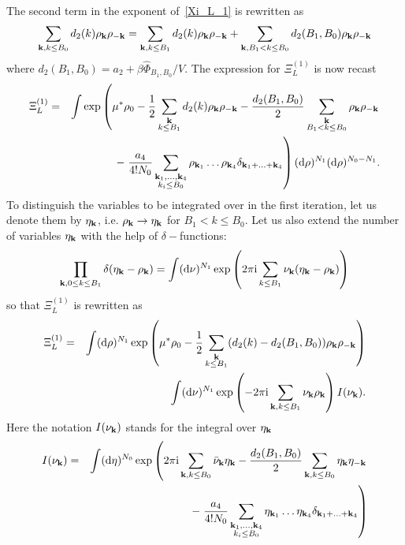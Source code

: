 The second term in the exponent of~\eqref{Xi_L_1} is rewritten as
\begin{equation*}
	\sum_{\substack{\vb k, k \leq B_0}} d_2(k) \rho_{\vb k} \rho_{-\vb k} 
	= 
	\sum_{\substack{\vb k, k \leq B_1}} d_2(k) \rho_{\vb k} \rho_{-\vb k}
	+
	\sum_{\substack{\vb k, B_1 < k \leq B_0}} d_2(B_1, B_0) \rho_{\vb k} \rho_{-\vb k}
\end{equation*}
where $d_2(B_1, B_0) = a_2 + \beta\hat{\Phi}_{B_1, B_0}/V$.
The expression for $\Xi_L^{(1)}$ is now recast
\begin{eqnarray*}
	\Xi_L^{(1)} &=& 
	\int \exp\left(
	\mu^* \rho_0 - \frac{1}{2} \sum_{\substack{\vb k \\ k \leq B_1}} d_2(k) \rho_{\vb k} \rho_{-\vb k}
	- \frac{d_2(B_1, B_0)}{2} \sum_{\substack{\vb k \\ B_1 < k \leq B_0}} \rho_{\vb k} \rho_{-\vb k}  
	\right.
	\\
	&& -\left. \frac{a_4}{4! N_0} \sum_{\substack{\vb k_1, \dotsc, \vb k_4 \\ k_i \leq B_0}} \rho_{\vb k_1} \dotsc \rho_{\vb k_4} \delta_{\vb{k}_1 + \dotsc + \vb{k}_4} \right) 
	({\rm d} \rho)^{N_1} ({\rm d} \rho)^{N_0 - N_1}
	\nonumber.
\end{eqnarray*}
To distinguish the variables to be integrated over in the first iteration, let us denote them by $\eta_{\vb k}$, i.e. $\rho_{\vb k} \rightarrow \eta_{\vb k}$ for $B_1 < k \leq B_0$. Let us also extend the number of variables $\eta_{\vb k}$ with the help of $\delta-$functions:
\begin{equation*}
	\prod_{\vb{k}, 0\leq k \leq B_1}\delta(\eta_{\vb k}-\rho_{\vb k})
	= \int ({\rm d}\nu)^{N_1}\exp \left(2\pi{\rm i}\sum_{k\leq B_1}\nu_{\vb k}(\eta_{\vb k}-\rho_{\vb k})\right)
\end{equation*}
so that $\Xi_L^{(1)}$ is rewritten as 
\begin{eqnarray*}
	\Xi_L^{(1)} &=& 
	\int ({\rm d} \rho)^{N_1} \exp 
	\left(
		\mu^* \rho_0 - \frac{1}{2} \sum_{\substack{\vb k \\ k \leq B_1}} (d_2(k) - d_2(B_1, B_0) ) \rho_{\vb k} \rho_{-\vb k}
	\right)
	\\
	&&  \int ({\rm d}\nu)^{N_1} \exp \left(-2\pi{\rm i}\sum_{\vb k, k \leq B_1} \nu_{\vb k}\rho_{\vb k}\right)
	I(\nu_{\vb k}).
\end{eqnarray*}
Here the notation $I(\nu_{\vb k})$ stands for the integral over $\eta_{\vb k}$
\begin{eqnarray*}
	I(\nu_{\vb k}) & = & \int ({\rm d} \eta)^{N_0} \exp
	\left( 2\pi{\rm i} \sum_{\vb k, k \leq B_0} \bar{\nu}_{\vb k} \eta_{\vb k} - \frac{d_2(B_1, B_0)}{2} \sum_{\vb k, k \leq B_0} \eta_{\vb k} \eta_{-\vb k}
	\right.
	\\
	&& - \left. \frac{a_4}{4! N_0} \sum_{\substack{\vb k_1, \dotsc, \vb k_4 \\ k_i \leq B_0}} \eta_{\vb k_1} \dotsc \eta_{\vb k_4} \delta_{\vb{k}_1 + \dotsc + \vb{k}_4} \right)
\end{eqnarray*}
